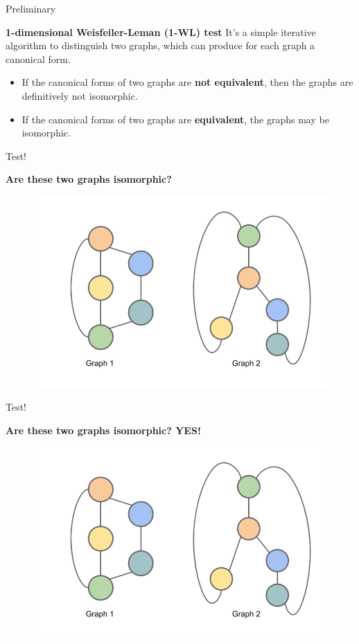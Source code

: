 \documentclass[aspectratio=169,mathserif]{beamer}  %
\newcommand{\tb}{\textbf}
\begin{document}
\begin{frame}{Preliminary}

\tb{1-dimensional Weisfeiler-Leman (1-WL) test} 
It's a simple iterative algorithm to distinguish two graphs, which can produce for each graph a canonical form. 

\pause
\begin{itemize}[<+->]
    \item If the canonical forms of two graphs are \tb{not equivalent}, then the graphs are definitively not isomorphic. 
    \item If the canonical forms of two graphs are \tb{equivalent}, the graphs may be isomorphic. 
\end{itemize}

\end{frame}





\begin{frame}{Test!}

\tb{Are these two graphs isomorphic?}

\begin{figure}[t]
\centerline{\includegraphics[width=0.7\linewidth]{figure9.png}}
\end{figure}

\end{frame}



\begin{frame}{Test!}

\tb{Are these two graphs isomorphic? YES!}

\begin{figure}[t]
\centerline{\includegraphics[width=0.7\linewidth]{figure9.png}}
\end{figure}

\end{frame}
\end{document}
